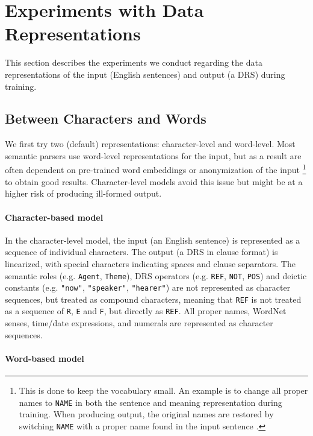 \documentclass[11pt,a4paper]{article}
\begin{document}
\section{Experiments with Data Representations}
\label{sec:rep_exp}

This section describes the experiments we conduct regarding the data representations of the input (English sentences) and output (a DRS) during training.

\subsection{Between Characters and Words}

We first try two (default) representations: character-level and word-level. Most semantic parsers use word-level representations for the input, but as a result are often dependent on pre-trained word embeddings or anonymization of the input
\footnote{This is done to keep the vocabulary small. An example is to change all proper names to \texttt{NAME} in both the sentence and meaning representation during training. When producing output, the original names are restored by switching \texttt{NAME} with a proper name found in the input sentence \cite{konstas:17}.}
to obtain good results. Character-level models avoid this issue but might be at a higher risk of producing ill-formed output.

\paragraph{Character-based model}

In the character-level model, the input (an English sentence) is represented as a sequence of individual characters. The output (a DRS in clause format) is linearized, with special characters indicating spaces and clause separators. The semantic roles  (e.g. \texttt{Agent}, \texttt{Theme}), DRS operators (e.g. \texttt{REF}, \texttt{NOT}, \texttt{POS}) and deictic constants (e.g. \texttt{"now"}, \texttt{"speaker"}, \texttt{"hearer"}) are not represented as character sequences, but treated as compound characters, meaning that \texttt{REF} is not treated as a sequence of \texttt{R}, \texttt{E} and \texttt{F}, but directly as \texttt{REF}.
All proper names, WordNet senses, time/date expressions, and numerals are represented as character sequences.

\paragraph{Word-based model}
\end{document}

